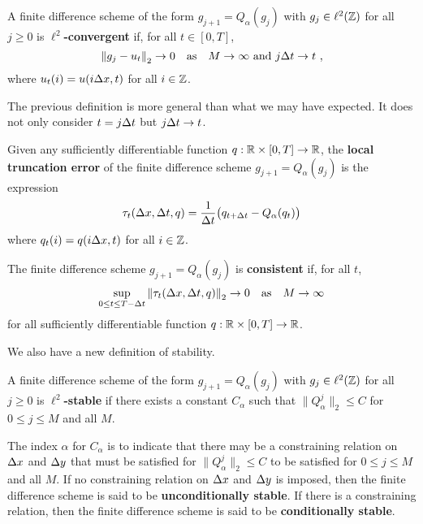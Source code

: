 \begin{defn} \label{ell2ConvDefN1}
A finite difference scheme of the form $g_{j+1} = Q_\alpha(g_j)$ with
$g_j \in \ell^2(\mathbb{Z})$ for all $j \geq 0$ is
{\bfseries $\ell^2$-convergent}
 if, for all
$t \in [0,T]$,
\[
\left\| g_j - u_t \right\|_2 \to 0
\quad \text{as} \quad M \to \infty \ \text{and} \ j\dtx{t} \to t \ ,
\]
where $\displaystyle u_t(i) = u(i \Delta{x}, t)$ for all $i \in \mathbb{Z}$.
\end{defn}

The previous definition is more general than what we may have
expected.  It does not only consider $t = j \Delta{t}$ but
$j\Delta{t} \to t$.

\begin{defn}
Given any sufficiently differentiable function $q:\mathbb{R}\times [0,T] \to \mathbb{R}$,
the {\bfseries local truncation error} of the finite difference scheme $g_{j+1} = Q_\alpha(g_j)$
is the expression
\[
\tau_t(\Delta{x},\Delta{t},q) = \frac{1}{\Delta{t}}
\big(q_{t+\Delta{t}} - Q_\alpha(q_t)\big)
\]
where $q_t(i) = q(i \Delta{x}, t)$ for all $i \in \mathbb{Z}$.

The finite difference scheme $g_{j+1} = Q_\alpha(g_j)$ is
{\bfseries consistent}
if, for all $t$,
\[
\sup_{0\leq t \leq T-\Delta t}\left\|\tau_t(\Delta{x},\Delta{t},q)\right\|_2
\rightarrow 0 \quad \text{as} \quad
M \rightarrow \infty
\]
for all sufficiently differentiable function $q:\mathbb{R}\times [0,T] \to \mathbb{R}$.
\end{defn}

We also have a new definition of stability.

\begin{defn} \label{fdmStableDefNo2}
A finite difference scheme of the form $g_{j+1} = Q_\alpha(g_j)$
with $g_j \in \ell^2(\mathbb{Z})$ for all $j \geq 0$ is
{\bfseries $\ell^2$-stable} if there exists a constant $C_\alpha$ such
that $\|Q_\alpha^j\|_2 \leq C$ for $0 \leq j \leq M$ and all $M$.

The index $\alpha$ for $C_\alpha$ is to indicate that there may be a
constraining relation on $\Delta{x}$ and $\Delta{y}$ that must be
satisfied for $\|Q_\alpha^j\|_2 \leq C$ to be satisfied for
$0 \leq j \leq M$ and all $M$.  If no
constraining relation on $\Delta{x}$ and $\Delta{y}$ is imposed, then the
finite difference scheme is said to be
{\bfseries unconditionally stable}.
If there is a constraining relation, then the finite difference scheme
is said to be {\bfseries conditionally stable}.
\end{defn}

